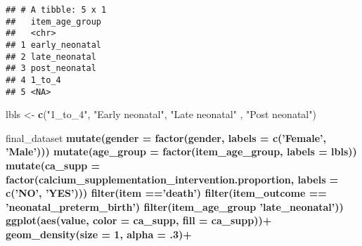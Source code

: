 \documentclass[]{article}
\newenvironment{Shaded}{\begin{snugshade}}{\end{snugshade}}
\newcommand{\DataTypeTok}[1]{\textcolor[rgb]{0.13,0.29,0.53}{#1}}
\newcommand{\DecValTok}[1]{\textcolor[rgb]{0.00,0.00,0.81}{#1}}
\newcommand{\FloatTok}[1]{\textcolor[rgb]{0.00,0.00,0.81}{#1}}
\newcommand{\KeywordTok}[1]{\textcolor[rgb]{0.13,0.29,0.53}{\textbf{#1}}}
\newcommand{\NormalTok}[1]{#1}
\newcommand{\OperatorTok}[1]{\textcolor[rgb]{0.81,0.36,0.00}{\textbf{#1}}}
\newcommand{\StringTok}[1]{\textcolor[rgb]{0.31,0.60,0.02}{#1}}
\begin{document}
\begin{verbatim}
## # A tibble: 5 x 1
##   item_age_group
##   <chr>         
## 1 early_neonatal
## 2 late_neonatal 
## 3 post_neonatal 
## 4 1_to_4        
## 5 <NA>
\end{verbatim}

\begin{Shaded}
\begin{Highlighting}[]
\NormalTok{lbls <-}\StringTok{ }\KeywordTok{c}\NormalTok{(}\StringTok{"1_to_4"}\NormalTok{, }\StringTok{"Early neonatal"}\NormalTok{, }\StringTok{"Late neonatal"}\NormalTok{ , }\StringTok{"Post neonatal"}\NormalTok{)}
\end{Highlighting}
\end{Shaded}

\begin{Shaded}
\begin{Highlighting}[]
\NormalTok{final_dataset }\OperatorTok{%>%}\StringTok{ }
\StringTok{  }\KeywordTok{mutate}\NormalTok{(}\DataTypeTok{gender =} \KeywordTok{factor}\NormalTok{(gender, }
                         \DataTypeTok{labels =} \KeywordTok{c}\NormalTok{(}\StringTok{'Female'}\NormalTok{, }\StringTok{'Male'}\NormalTok{))) }\OperatorTok{%>%}\StringTok{ }
\StringTok{  }\KeywordTok{mutate}\NormalTok{(}\DataTypeTok{age_group =} \KeywordTok{factor}\NormalTok{(item_age_group,}
                                 \DataTypeTok{labels =}\NormalTok{ lbls)) }\OperatorTok{%>%}\StringTok{ }
\StringTok{  }\KeywordTok{mutate}\NormalTok{(}\DataTypeTok{ca_supp =} \KeywordTok{factor}\NormalTok{(calcium_supplementation_intervention.proportion,}
                          \DataTypeTok{labels =} \KeywordTok{c}\NormalTok{(}\StringTok{'NO'}\NormalTok{, }\StringTok{'YES'}\NormalTok{))) }\OperatorTok{%>%}\StringTok{ }
\StringTok{  }\KeywordTok{filter}\NormalTok{(item }\OperatorTok{==}\StringTok{'death'}\NormalTok{) }\OperatorTok{%>%}\StringTok{ }
\StringTok{  }\KeywordTok{filter}\NormalTok{(item_outcome }\OperatorTok{==}\StringTok{ 'neonatal_preterm_birth'}\NormalTok{) }\OperatorTok{%>%}\StringTok{ }
\StringTok{  }\KeywordTok{filter}\NormalTok{(item_age_group }\OperatorTok{%in%}\StringTok{ }\KeywordTok{c}\NormalTok{(}\StringTok{'early_neonatal'}\NormalTok{,}
                               \StringTok{'late_neonatal'}\NormalTok{)) }\OperatorTok{%>%}
\StringTok{  }\KeywordTok{ggplot}\NormalTok{(}\KeywordTok{aes}\NormalTok{(value,}
             \DataTypeTok{color =}\NormalTok{ ca_supp,}
             \DataTypeTok{fill =}\NormalTok{ ca_supp))}\OperatorTok{+}
\StringTok{  }\KeywordTok{geom_density}\NormalTok{(}\DataTypeTok{size =} \DecValTok{1}\NormalTok{, }\DataTypeTok{alpha =} \FloatTok{.3}\NormalTok{)}\OperatorTok{+}
}}}}}}}}
\end{Highlighting}
\end{Shaded}
\end{document}
